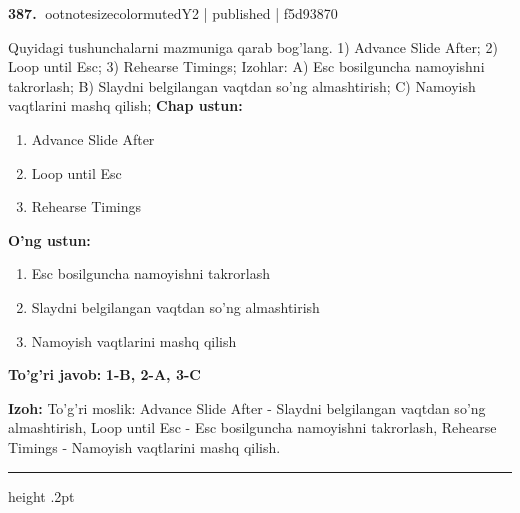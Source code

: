 \documentclass[10pt,a4paper]{article}
\begin{document}
\textbf{\color{ink}387.} {ootnotesizecolor{muted}Y2 | published | f5d93870}
\par
Quyidagi tushunchalarni mazmuniga qarab bog'lang.  1) Advance Slide After;  2) Loop until Esc;  3) Rehearse Timings;  Izohlar: A) Esc bosilguncha namoyishni takrorlash;  B) Slaydni belgilangan vaqtdan so'ng almashtirish;  C) Namoyish vaqtlarini mashq qilish;
\textbf{Chap ustun:}\begin{enumerate}[label=\arabic*),leftmargin=9mm]
\item Advance Slide After
\item Loop until Esc
\item Rehearse Timings
\end{enumerate}
\textbf{O'ng ustun:}\begin{enumerate}[label=\Alph*),leftmargin=9mm]
\item Esc bosilguncha namoyishni takrorlash
\item Slaydni belgilangan vaqtdan so'ng almashtirish
\item Namoyish vaqtlarini mashq qilish
\end{enumerate}
\begin{tcolorbox}[enhanced,breakable,colback=teal!4,colframe=teal!55!black,boxrule=0.45pt,arc=1.2mm,left=2.8mm,right=2.8mm,top=2mm,bottom=2mm]
\textbf{\color{teal}To'g'ri javob:} \textbf{1-B, 2-A, 3-C}
\par\smallskip
\textbf{Izoh:} To'g'ri moslik: Advance Slide After - Slaydni belgilangan vaqtdan so'ng almashtirish, Loop until Esc - Esc bosilguncha namoyishni takrorlash, Rehearse Timings - Namoyish vaqtlarini mashq qilish.
\end{tcolorbox}
\vspace{2mm}\hrule height .2pt\vspace{2mm}
\end{document}
